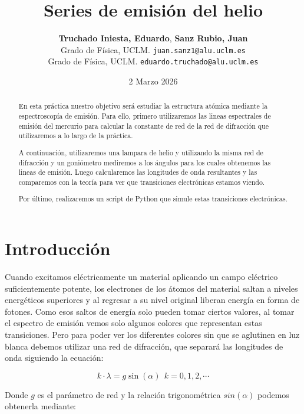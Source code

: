 \documentclass[11pt, a4paper, twocolumn]{article}
\title{\textbf{\Large Series de emisión del helio}}
\author{
	\textbf{Truchado Iniesta, Eduardo}, \textbf{Sanz Rubio, Juan} \\
	\small Grado de Física, UCLM. \texttt{juan.sanz1@alu.uclm.es} \\
	\small Grado de Física, UCLM. \texttt{eduardo.truchado@alu.uclm.es}
}
\date{\small 2 Marzo 2026}
\begin{document}
\maketitle
\thispagestyle{fancy}


\begin{abstract}

En esta práctica nuestro objetivo será estudiar la estructura atómica
mediante la espectroscopía de emisión. Para ello, primero utilizaremos las 
lineas espectrales de emisión del mercurio para calcular la constante 
de red de la red de difracción que utilizaremos a lo largo de la práctica.

\vspace{0.1cm}

A continuación, utilizaremos una lampara de helio y utilizando la misma 
red de difracción y un goniómetro mediremos a los ángulos para los cuales
obtenemos las lineas de emisión. Luego calcularemos las longitudes de 
onda resultantes y las comparemos con la teoría para ver que transiciones 
electrónicas estamos viendo. 

\vspace{0.1cm}

Por último, realizaremos un script de Python que simule estas transiciones 
electrónicas.

\end{abstract}


\section{Introducción}
Cuando excitamos eléctricamente un material aplicando un campo eléctrico 
suficientemente potente, los electrones de los átomos del material 
saltan a niveles energéticos superiores y al regresar a su nivel original 
liberan energía en forma de fotones. Como esos saltos de energía solo pueden 
tomar ciertos valores, al tomar el espectro de emisión vemos solo algunos colores 
que representan estas transiciones. Pero para poder ver los diferentes colores 
sin que se aglutinen en luz blanca debemos utilizar una red de difracción, que 
separará las longitudes de onda siguiendo la ecuación:

\begin{equation}
	k \cdot \lambda = g \sin{(\alpha)} \:\: k=0,1,2,\cdots
\end{equation}

Donde $g$ es el parámetro de red y la relación trigonométrica $sin(\alpha)$ podemos 
obtenerla mediante:
\end{document}

